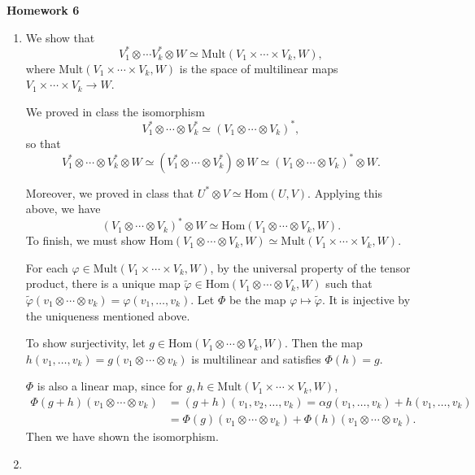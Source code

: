 \documentclass[11pt, reqno]{article}
\theoremstyle{plain}
\theoremstyle{definition}
\theoremstyle{remark}
\renewcommand{\phi}{\varphi}
\begin{document}
\topmargin=-40pt
\renewcommand{\headrulewidth}{1pt}
\renewcommand{\headsep}{20pt}
\thispagestyle{fancy}

{\Huge \bfseries \noindent Homework 6}

\begin{enumerate}
    \item[1.] We show that 
    \[
        V_1^* \otimes \cdots V_k^* \otimes W \simeq \text{Mult}(V_1\times \cdots \times V_k, W),
    \]
    where $\text{Mult}(V_1\times \cdots \times V_k, W)$ is the space of multilinear maps $V_1 \times \cdots \times V_k
    \to W$.

    We proved in class the isomorphism 
    \[
        V_1^*\otimes \cdots\otimes V_k^* \simeq (V_1 \otimes \cdots \otimes V_k)^*,
    \]
    so that
    \[
        V_1^*\otimes \cdots \otimes V_k^*\otimes W \simeq 
        (V_1^*\otimes \cdots \otimes V_k^*)\otimes W \simeq (V_1 \otimes \cdots \otimes V_k)^*\otimes W.
    \]

    Moreover, we proved in class that $U^*\otimes V \simeq \text{Hom}(U, V)$. Applying this above, we have 
    \[
        (V_1 \otimes \cdots \otimes V_k)^*\otimes W \simeq \text{Hom}(V_1 \otimes\cdots\otimes V_k, W).
    \]
    To finish, we must show $\text{Hom}(V_1 \otimes\cdots\otimes V_k, W) \simeq \text{Mult}(V_1\times \cdots \times V_k, W)$.

    For each $\phi \in \text{Mult}(V_1\times \cdots \times V_k, W)$, by the universal property of the tensor
    product, there is a unique map $\tilde{\phi} \in \text{Hom}(V_1 \otimes\cdots\otimes V_k, W)$ such
    that $\tilde{\phi}(v_1 \otimes \cdots \otimes v_k) = \phi(v_1, \dots, v_k)$. Let 
    $\Phi$ be the map $\phi \mapsto \tilde{\phi}$. It is injective by the uniqueness mentioned above. 
    
    To show surjectivity, let $g \in \text{Hom}(V_1 \otimes\cdots\otimes V_k, W)$. Then 
    the map $h(v_1,\dots, v_k) = g(v_1\otimes \cdots \otimes v_k)$ is multilinear and satisfies $\Phi(h) = g$. 

    $\Phi$ is also a linear map, since for $g, h \in \text{Mult}(V_1\times \cdots \times V_k, W)$,
    \begin{align*}
        \Phi(g + h)(v_1\otimes \cdots \otimes v_k) &= (g + h)(v_1, v_2,\dots, v_k)
        = \alpha g(v_1, \dots, v_k) + h(v_1, \dots, v_k) \\
        &= \Phi(g)(v_1\otimes \cdots\otimes v_k) + \Phi(h)(v_1\otimes \cdots\otimes v_k).
    \end{align*}
    Then we have shown the isomorphism.

    \item[2.] 
    
\end{enumerate}
\end{document}
